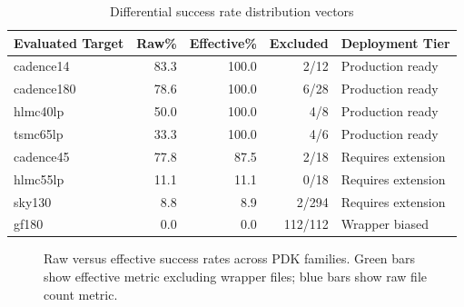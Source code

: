 \documentclass[10pt,twocolumn]{article}
\begin{document}
\begin{table}[t]
\caption{Differential success rate distribution vectors}
\label{tab:cases}
\centering
\renewcommand{\arraystretch}{1.1}
\begin{tabular}{@{}lrrrl@{}}
\toprule
Evaluated Target & Raw\% & Effective\% & Excluded & Deployment Tier \\
\midrule
cadence14 & 83.3 & 100.0 & 2/12 & Production ready \\
cadence180 & 78.6 & 100.0 & 6/28 & Production ready \\
hlmc40lp & 50.0 & 100.0 & 4/8 & Production ready \\
tsmc65lp & 33.3 & 100.0 & 4/6 & Production ready \\
cadence45 & 77.8 & 87.5 & 2/18 & Requires extension \\
hlmc55lp & 11.1 & 11.1 & 0/18 & Requires extension \\
sky130 & 8.8 & 8.9 & 2/294 & Requires extension \\
gf180 & 0.0 & 0.0 & 112/112 & Wrapper biased \\
\bottomrule
\end{tabular}
\end{table}

\begin{figure}[b]
\centering
{}
\caption{Raw versus effective success rates across PDK families. Green bars show effective metric excluding wrapper files; blue bars show raw file count metric.}
\label{fig:rates}
\end{figure}
\end{document}

